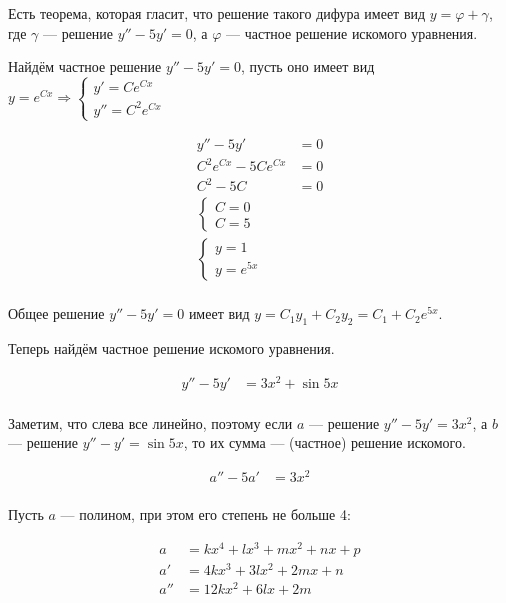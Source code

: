 



Есть теорема, которая гласит, что решение такого дифура имеет вид $y=\varphi + \gamma$, где $\gamma$ --- решение $y''-5y'=0$, а $\varphi$ --- частное решение искомого уравнения.

Найдём частное решение $y''-5y'=0$, пусть оно имеет вид $y = e^{Cx} \Rightarrow \begin{cases} y'= Ce^{Cx} \\ y'' = C^2e^{Cx} \end{cases}$

\begin{align*}
    y''-5y'            & = 0  \\
    C^2e^{Cx}-5Ce^{Cx} & = 0  \\
    C^2-5C             & = 0  \\
    \begin{cases}
        C = 0 \\
        C = 5
    \end{cases} \\
    \begin{cases}
        y = 1 \\
        y = e^{5x}
    \end{cases} \\
\end{align*}

Общее решение $y''-5y'=0$ имеет вид $y = C_1 y_1 + C_2 y_2 = C_1 + C_2e^{5x}$.

Теперь найдём частное решение искомого уравнения.

\begin{align*}
    y''-5y' & = 3x^2+\sin 5x \\
\end{align*}

Заметим, что слева все линейно, поэтому если $a$ --- решение $y'' - 5y' = 3x^2$,  а $b$ --- решение $y'' - y' = \sin 5x$, то их сумма --- (частное) решение искомого.

\begin{align*}
    a''-5a' & = 3x^2 \\
\end{align*}

Пусть $a$ --- полином, при этом его степень не больше 4:

\begin{align*}
    a   & = kx^4 + lx^3 + mx^2 + nx + p \\
    a'  & = 4kx^3 + 3lx^2 + 2mx + n     \\
    a'' & = 12kx^2 + 6lx + 2m           \\
\end{align*}

